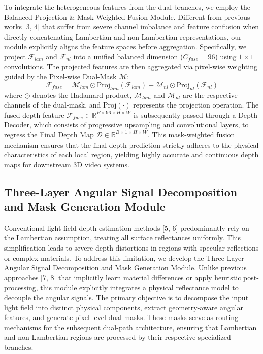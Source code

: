To integrate the heterogeneous features from the dual branches, we employ the Balanced Projection \& Mask-Weighted Fusion Module. Different from previous works [3, 4] that suffer from severe channel imbalance and feature confusion when directly concatenating Lambertian and non-Lambertian representations, our module explicitly aligns the feature spaces before aggregation. Specifically, we project $\mathcal{F}_{lam}$ and $\mathcal{F}_{nl}$ into a unified balanced dimension ($C_{fuse} = 96$) using $1 \times 1$ convolutions. The projected features are then aggregated via pixel-wise weighting guided by the Pixel-wise Dual-Mask $\mathcal{M}$:
\begin{equation}
\label{eq:eq1}
\mathcal{F}_{fuse} = \mathcal{M}_{lam} \odot \text{Proj}_{lam}(\mathcal{F}_{lam}) + \mathcal{M}_{nl} \odot \text{Proj}_{nl}(\mathcal{F}_{nl})
\end{equation}
where $\odot$ denotes the Hadamard product, $\mathcal{M}_{lam}$ and $\mathcal{M}_{nl}$ are the respective channels of the dual-mask, and $\text{Proj}(\cdot)$ represents the projection operation. The fused depth feature $\mathcal{F}_{fuse} \in \mathbb{R}^{B \times 96 \times H \times W}$ is subsequently passed through a Depth Decoder, which consists of progressive upsampling and convolutional layers, to regress the Final Depth Map $\mathcal{D} \in \mathbb{R}^{B \times 1 \times H \times W}$. This mask-weighted fusion mechanism ensures that the final depth prediction strictly adheres to the physical characteristics of each local region, yielding highly accurate and continuous depth maps for downstream 3D video systems.

\subsection{Three-Layer Angular Signal Decomposition and Mask Generation Module}

Conventional light field depth estimation methods [5, 6] predominantly rely on the Lambertian assumption, treating all surface reflectances uniformly. This simplification leads to severe depth distortions in regions with specular reflections or complex materials. To address this limitation, we develop the Three-Layer Angular Signal Decomposition and Mask Generation Module. Unlike previous approaches [7, 8] that implicitly learn material differences or apply heuristic post-processing, this module explicitly integrates a physical reflectance model to decouple the angular signals. The primary objective is to decompose the input light field into distinct physical components, extract geometry-aware angular features, and generate pixel-level dual masks. These masks serve as routing mechanisms for the subsequent dual-path architecture, ensuring that Lambertian and non-Lambertian regions are processed by their respective specialized branches.

